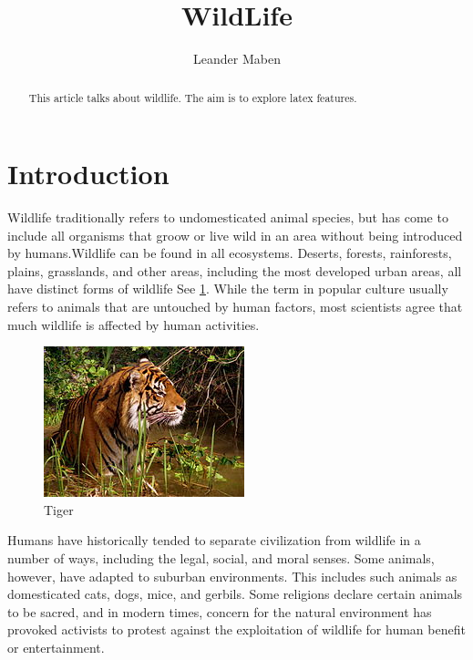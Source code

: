 \documentclass[a4paper,11pt]{report}
\title{WildLife}
\author{Leander Maben}
\begin{document}
\maketitle
\tableofcontents

\begin{abstract}
This article talks about wildlife.
The aim is to explore latex features.
\end{abstract}

\section{Introduction}
Wildlife traditionally refers to undomesticated animal species, but has come to include all organisms that groow or live wild in an area without being introduced by humans.Wildlife can be found in all ecosystems. Deserts, forests, rainforests, plains, grasslands, and other areas, including the most developed urban areas, all have distinct forms of wildlife See \ref{tiger}. While the term in popular culture usually refers to animals that are untouched by human factors, most scientists agree that much wildlife is affected by human activities.
\begin{figure}[h]
\label{tiger}
\caption{Tiger}
\includegraphics[width=\textwidth,keepaspectratio=true,height=\textheight]
{tiger.jpg}
\end{figure}
Humans have historically tended to separate civilization from wildlife in a number of ways, including the legal, social, and moral senses. Some animals, however, have adapted to suburban environments. This includes such animals as domesticated cats, dogs, mice, and gerbils. Some religions declare certain animals to be sacred, and in modern times, concern for the natural environment has provoked activists to protest against the exploitation of wildlife for human benefit or entertainment.
\end{document}
